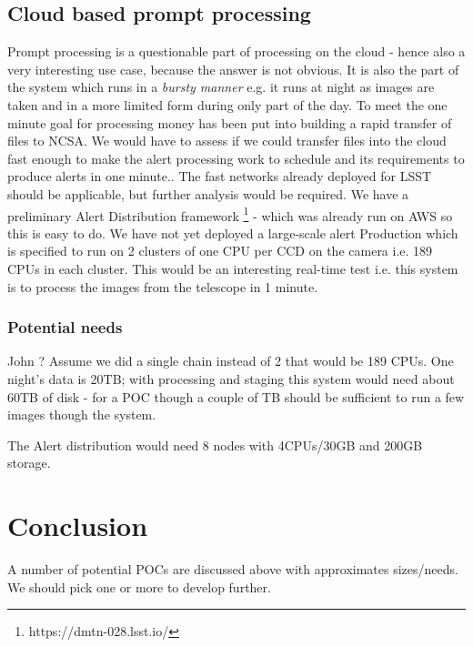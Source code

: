 \subsection{Cloud based prompt processing}\label{sect:pp}

Prompt processing  is a questionable part of processing on the cloud - hence also a very interesting use case, because the answer is not obvious. It is also the part of the system which runs in a {\em bursty manner} e.g. it runs at night as images are taken and in a more limited form during only part of the day.
To meet the one minute goal for processing money has been put into building a rapid transfer of files to NCSA.
We would have to assess if we could transfer files into the cloud fast enough to make the alert processing work to schedule and its requirements to produce alerts in one minute..
The fast networks already deployed for LSST should be applicable, but further analysis would be required.
We have a preliminary Alert Distribution framework \footnote{https://dmtn-028.lsst.io/} - which was already run on AWS so this is easy to do.
We have not yet deployed a large-scale alert Production which is specified to run on  2 clusters of one CPU per CCD on the camera i.e. 189 CPUs in each cluster.
This would be an interesting real-time test i.e. this system is to process the images from the telescope in 1 minute.

\subsubsection{Potential needs}
{\color{red} John ?}
 Assume we did a single chain instead of 2 that would be 189 CPUs.  One night's data is 20TB; with processing and staging this system would need about 60TB of disk - for a POC though a couple of TB should be sufficient to run a few images though the system.

The Alert distribution would need 8 nodes with 4CPUs/30GB and 200GB storage.



\section{Conclusion}
A number of potential POCs are discussed above with approximates sizes/needs. We should pick one or more to develop further.

